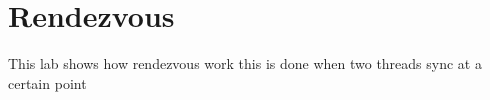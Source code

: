\hypertarget{index_Rendezvous}{}\section{Rendezvous}\label{index_Rendezvous}
This lab shows how rendezvous work this is done when two threads sync at a certain point 